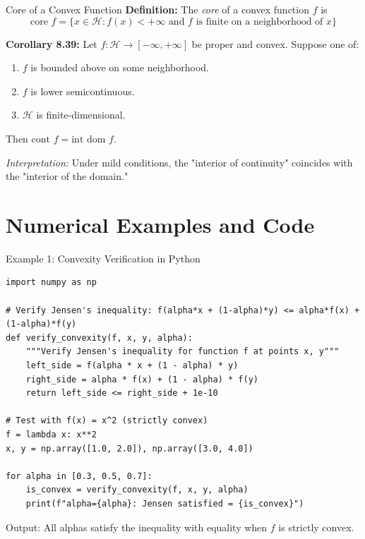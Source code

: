 \documentclass[aspectratio=169,10pt]{beamer}
\begin{document}
\begin{frame}[fragile]{Core of a Convex Function}
    \textbf{Definition:} The \textit{core} of a convex function $f$ is
    \[
    \text{core } f = \{x \in \mathcal{H} : f(x) < +\infty \text{ and } f \text{ is finite on a neighborhood of } x\}
    \]

    \vspace{0.3cm}

    \textbf{Corollary 8.39:} Let $f : \mathcal{H} \to [-\infty, +\infty]$ be proper and convex. 
    Suppose one of:
    
    \begin{enumerate}
        \item $f$ is bounded above on some neighborhood.
        \item $f$ is lower semicontinuous.
        \item $\mathcal{H}$ is finite-dimensional.
    \end{enumerate}
    
    Then $\text{cont } f = \text{int dom } f$.

    \vspace{0.3cm}

    \textit{Interpretation:} Under mild conditions, the "interior of continuity" coincides with the "interior of the domain."
\end{frame}


\section{Numerical Examples and Code}

\begin{frame}[fragile]{Example 1: Convexity Verification in Python}
    \begin{lstlisting}[style=python]
import numpy as np

# Verify Jensen's inequality: f(alpha*x + (1-alpha)*y) <= alpha*f(x) + (1-alpha)*f(y)
def verify_convexity(f, x, y, alpha):
    """Verify Jensen's inequality for function f at points x, y"""
    left_side = f(alpha * x + (1 - alpha) * y)
    right_side = alpha * f(x) + (1 - alpha) * f(y)
    return left_side <= right_side + 1e-10

# Test with f(x) = x^2 (strictly convex)
f = lambda x: x**2
x, y = np.array([1.0, 2.0]), np.array([3.0, 4.0])

for alpha in [0.3, 0.5, 0.7]:
    is_convex = verify_convexity(f, x, y, alpha)
    print(f"alpha={alpha}: Jensen satisfied = {is_convex}")
    \end{lstlisting}

    \vspace{0.2cm}
    Output: All alphas satisfy the inequality with equality when $f$ is strictly convex.
\end{frame}
\end{document}
